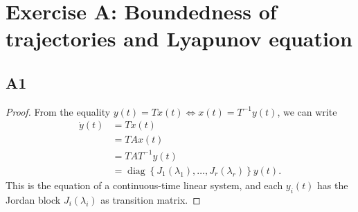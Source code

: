\documentclass[11pt]{article}
\DeclareMathOperator{\diag}{diag}
\begin{document}
\section*{Exercise A: Boundedness of trajectories and Lyapunov equation}
\subsection*{A1}
\begin{proof}
From the equality \(y(t) = T x(t) \iff x(t) = T^{-1} y(t)\), we can write
\begin{align*}
    \dot{y}(t) &= T \dot{x}(t) \\
    &= T A x(t) \\
    &= T A T^{-1} y(t) \\
    &= \diag\left\{J_1(\lambda_1), \dots, J_r(\lambda_r)\right\} y(t).
\end{align*}
This is the equation of a continuous-time linear system, and each \(y_i(t)\) has the Jordan block \(J_i(\lambda_i)\) as transition matrix.
\end{proof}
\end{document}
